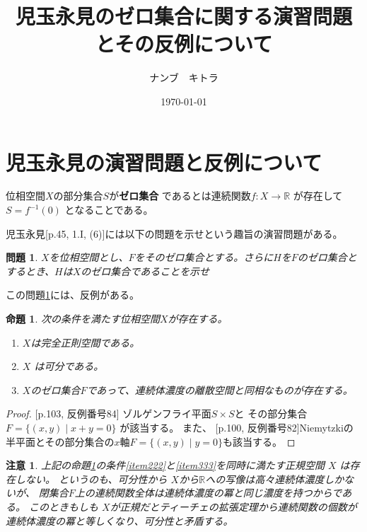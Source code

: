 \documentclass[leqno, a4paper, 12pt]{jsarticle}
\title{児玉永見のゼロ集合に関する演習問題とその反例について}
\author{ナンブ　キトラ}
\date{\today}
\newtheorem{prop}[thm]{命題}
\newtheorem{mon}[thm]{問題}
\newtheorem*{rmk}{注意}
\newcommand{\rr}{\mathbb{R}}
\begin{document}
\maketitle

\section{児玉永見の演習問題と反例について}

位相空間$X$の部分集合$S$が\textbf{ゼロ集合}
であるとは連続関数$f\colon X\to \rr$
が存在して$S=f^{-1}(0)$
となることである。

児玉永見\cite{kodamanagami1}[p.45, 1.I, (6)]には以下の問題を示せという趣旨の演習問題がある。

\begin{mon}\label{mon1}
$X$を位相空間とし、$F$をそのゼロ集合とする。さらに$H$を$F$のゼロ集合とするとき、$H$は$X$のゼロ集合であることを示せ
\end{mon}

この問題\ref{mon1}には、反例がある。

\begin{prop}\label{prop111}
次の条件を満たす位相空間$X$が存在する。
\begin{enumerate}
\item\label{item111}
$X$は完全正則空間である。
\item\label{item222}
$X$
は可分である。
\item\label{item333}
$X$のゼロ集合$F$であって、連続体濃度の離散空間と同相なものが存在する。

\end{enumerate}
\end{prop}
\begin{proof}
\cite{cex}[p.103, 反例番号84]
ゾルゲンフライ平面$S\times S$と
その部分集合$F=\{(x, y)\mid x+y=0\}$
が該当する。
また、
\cite{cex}[p.100, 反例番号82]Niemytzkiの半平面とその部分集合の$x$軸$F=\{(x, y)\mid y=0\}$も該当する。
\end{proof}

\begin{rmk}
上記の命題\ref{prop111}の条件\ref{item222}と\ref{item333}を同時に満たす正規空間
$X$
は存在しない。
というのも、可分性から
$X$から$\rr$への写像は高々連続体濃度しかないが、
閉集合$F$上の連続関数全体は連続体濃度の冪と同じ濃度を持つからである。
このときもしも
$X$が正規だとティーチェの拡張定理から連続関数の個数が連続体濃度の冪と等しくなり、可分性と矛盾する。
\end{rmk}
\end{document}
